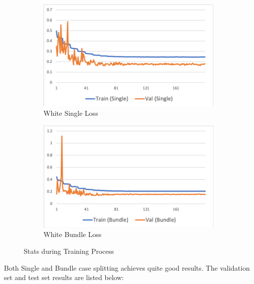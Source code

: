 \documentclass[10pt,twocolumn,letterpaper]{article}
\begin{document}
\begin{figure}[h!]
   \begin{subfigure}{0.25\textwidth}
      \centering
      \includegraphics[width=\linewidth]{fig/cnn_white_single.png}
      \caption{White Single Loss} \label{fig:k}
    \end{subfigure}\hspace*{\fill}
    \begin{subfigure}{0.25\textwidth}
      \centering
      \includegraphics[width=\linewidth]{fig/cnn_white_bundle.png}
      \caption{White Bundle Loss} \label{fig:k}
    \end{subfigure}\hspace*{\fill}
   \caption{Stats during Training Process} \label{fig:6}
\end{figure}   

Both Single and Bundle case splitting achieves quite good results.
The validation set and test set results are listed below:\\
\end{document}
